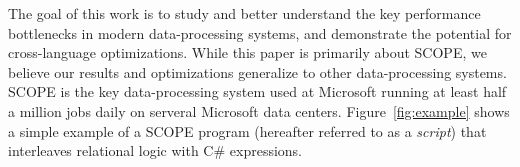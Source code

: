 The goal of this work is to study and better understand the key performance bottlenecks in modern data-processing systems, and demonstrate the potential for cross-language optimizations. While this paper is primarily about SCOPE, we believe our results and optimizations generalize to other data-processing systems. 
SCOPE is the key data-processing system used at Microsoft running at least half a million jobs daily on serveral Microsoft data centers. 
Figure~\ref{fig:example} shows a simple example of a SCOPE program (hereafter referred to as a {\em script}) that interleaves relational logic with C\# expressions.







